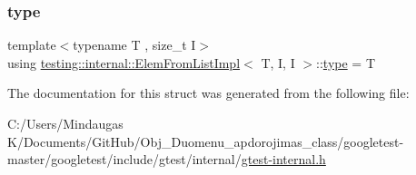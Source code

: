 \mbox{\label{structtesting_1_1internal_1_1_elem_from_list_impl_3_01_t_00_01_i_00_01_i_01_4_ab1552e339cc1ff1e0aa448d684ffaf39}} 
\subsubsection{\texorpdfstring{type}{type}\hspace{0.1cm}{\footnotesize\ttfamily [2/2]}}
{\footnotesize\ttfamily template$<$typename T , size\+\_\+t I$>$ \\
using \mbox{\hyperlink{structtesting_1_1internal_1_1_elem_from_list_impl}{testing\+::internal\+::\+Elem\+From\+List\+Impl}}$<$ T, I, I $>$\+::\mbox{\hyperlink{structtesting_1_1internal_1_1_elem_from_list_impl_3_01_t_00_01_i_00_01_i_01_4_ab1552e339cc1ff1e0aa448d684ffaf39}{type}} =  T}



The documentation for this struct was generated from the following file\+:\begin{DoxyCompactItemize}
\item 
C\+:/\+Users/\+Mindaugas K/\+Documents/\+Git\+Hub/\+Obj\+\_\+\+Duomenu\+\_\+apdorojimas\+\_\+class/googletest-\/master/googletest/include/gtest/internal/\mbox{\hyperlink{googletest-master_2googletest_2include_2gtest_2internal_2gtest-internal_8h}{gtest-\/internal.\+h}}\end{DoxyCompactItemize}
